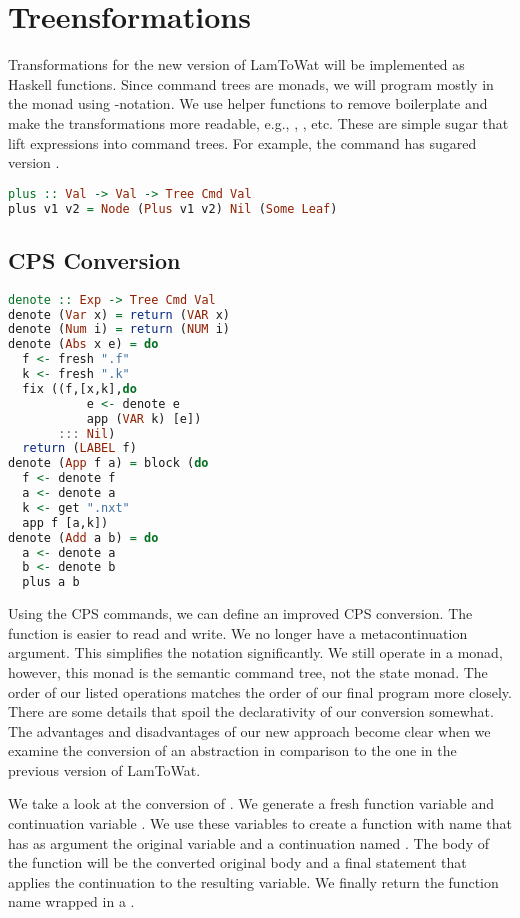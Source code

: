 \section{\label{section:treensforms}Treensformations}
Transformations for the new version of LamToWat will be implemented as Haskell functions. Since command trees are monads, we will program mostly in the monad using -notation. We use helper functions to remove boilerplate and make the transformations more readable, e.g., , , etc. These are simple sugar that lift expressions into command trees. For example, the  command has sugared version .

\begin{lstlisting}[language=Haskell]
plus :: Val -> Val -> Tree Cmd Val
plus v1 v2 = Node (Plus v1 v2) Nil (Some Leaf)
\end{lstlisting}

\subsection{\label{subsection:cpsconvert2}CPS Conversion}
\begin{lstlisting}[language=Haskell]
denote :: Exp -> Tree Cmd Val
denote (Var x) = return (VAR x)
denote (Num i) = return (NUM i)
denote (Abs x e) = do
  f <- fresh ".f"
  k <- fresh ".k"
  fix ((f,[x,k],do
           e <- denote e
           app (VAR k) [e])
       ::: Nil)
  return (LABEL f)
denote (App f a) = block (do
  f <- denote f
  a <- denote a
  k <- get ".nxt"
  app f [a,k])
denote (Add a b) = do
  a <- denote a
  b <- denote b
  plus a b
\end{lstlisting}

Using the \ac{CPS} commands, we can define an improved \ac{CPS} conversion. The function is easier to read and write. We no longer have a metacontinuation argument. This simplifies the notation significantly. We still operate in a monad, however, this monad is the semantic command tree, not the state monad. The order of our listed operations matches the order of our final program more closely. There are some details that spoil the declarativity of our conversion somewhat. The advantages and disadvantages of our new approach become clear when we examine the conversion of an abstraction in comparison to the one in the previous version of LamToWat.

We take a look at the conversion of . We generate a fresh function variable  and continuation variable . We use these variables to create a function with name  that has as argument the original variable and a continuation named . The body of the function will be the converted original body and a final statement that applies the continuation to the resulting variable. We finally return the function name wrapped in a .

